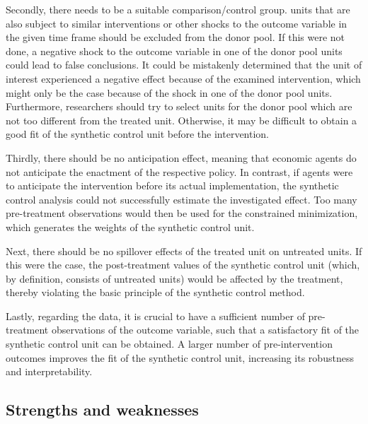 \documentclass{scrbook}
\begin{document}
Secondly, there needs to be a suitable comparison/control group. units
that are also subject to similar interventions or other shocks to the
outcome variable in the given time frame should be excluded from the
donor pool. If this were not done, a negative shock to the outcome
variable in one of the donor pool units could lead to false conclusions.
It could be mistakenly determined that the unit of interest experienced
a negative effect because of the examined intervention, which might only
be the case because of the shock in one of the donor pool units.
Furthermore, researchers should try to select units for the donor pool
which are not too different from the treated unit. Otherwise, it may be
difficult to obtain a good fit of the synthetic control unit before the
intervention.

Thirdly, there should be no anticipation effect, meaning that economic
agents do not anticipate the enactment of the respective policy. In
contrast, if agents were to anticipate the intervention before its
actual implementation, the synthetic control analysis could not
successfully estimate the investigated effect. Too many pre-treatment
observations would then be used for the constrained minimization, which
generates the weights of the synthetic control unit.

Next, there should be no spillover effects of the treated unit on
untreated units. If this were the case, the post-treatment values of the
synthetic control unit (which, by definition, consists of untreated
units) would be affected by the treatment, thereby violating the basic
principle of the synthetic control method.

Lastly, regarding the data, it is crucial to have a sufficient number of
pre-treatment observations of the outcome variable, such that a
satisfactory fit of the synthetic control unit can be obtained. A larger
number of pre-intervention outcomes improves the fit of the synthetic
control unit, increasing its robustness and interpretability.

\subsection*{Strengths and weaknesses}
\end{document}
